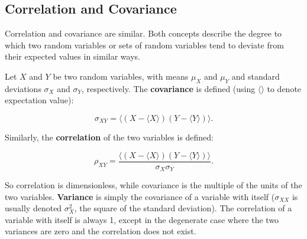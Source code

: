 \subsection{Correlation and Covariance}

Correlation and covariance are similar. Both concepts describe the degree to which two random variables or sets of random variables tend to deviate from their expected values in similar ways.

Let $X$ and $Y$ be two random variables, with means $\mu_{X}$ and $\mu_{Y}$ and standard deviations $\sigma_{X}$ and $\sigma_{Y}$, respectively. The \textbf{covariance} is defined (using $\langle \rangle$ to denote expectation value):

\begin{equation}
\sigma_{XY} = \langle (X - \langle X \rangle) (Y - \langle Y \rangle) \rangle.
\end{equation}

Similarly, the \textbf{correlation} of the two variables is defined:

\begin{equation}
\rho_{XY} = \frac{\langle (X - \langle X \rangle) (Y - \langle Y \rangle) \rangle}{\sigma_{X} \sigma_{Y}}.
\end{equation}

So correlation is dimensionless, while covariance is the multiple of the units of the two variables. \textbf{Variance} is simply the covariance of a variable with itself ($\sigma_{XX}$ is usually denoted $\sigma_{X}^{2}$, the square of the standard deviation). The correlation of a variable with itself is always 1, except in the degenerate case where the two variances are zero and the correlation does not exist.  

